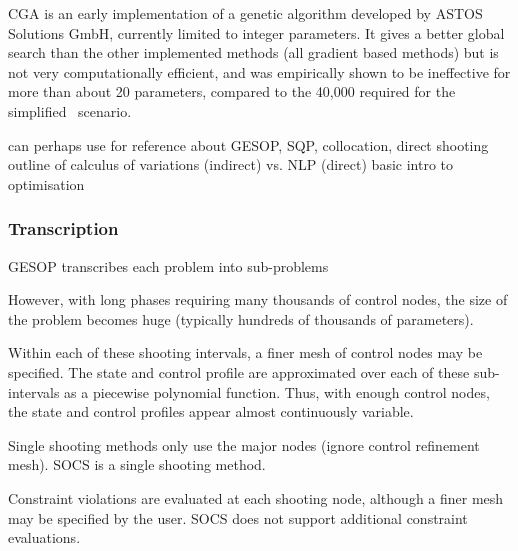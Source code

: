 CGA \parencite[Constrained Genetic Algorithm, ][]{ASTOS_guide} is an early implementation of a genetic algorithm developed by ASTOS Solutions GmbH, currently limited to integer parameters. It gives a better global search than the other implemented methods (all gradient based methods) but is not very computationally efficient, and was empirically shown to be ineffective for more than about 20 parameters, compared to the 40,000 required for the simplified \BW\ scenario.



can perhaps use \cite{Well2001} for reference about GESOP, SQP, collocation, direct shooting
\textcite{Enright1992} outline of calculus of variations (indirect) vs. NLP (direct)
\cite{Hughes2004}
\cite{Vasile2009}
\textcite{Nocedal2006} basic intro to optimisation



\subsubsection{Transcription}

GESOP transcribes each problem into sub-problems

However, with long phases requiring many thousands of control nodes, the size of the problem becomes huge (typically hundreds of thousands of parameters). 

Within each of these shooting intervals, a finer mesh of control nodes may be specified. The state and control profile are approximated over each of these sub-intervals as a piecewise polynomial function. Thus, with enough control nodes, the state and control profiles appear almost continuously variable.

Single shooting methods only use the major nodes (ignore control refinement mesh). SOCS is a single shooting method.

Constraint violations are evaluated at each shooting node, although a finer mesh may be specified by the user. SOCS does not support additional constraint evaluations.

